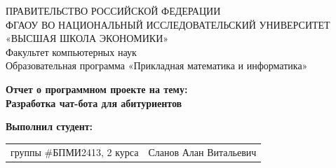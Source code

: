 \begin{titlepage}
\newpage

{
\begin{center}
ПРАВИТЕЛЬСТВО РОССИЙСКОЙ ФЕДЕРАЦИИ\\
ФГАОУ ВО НАЦИОНАЛЬНЫЙ ИССЛЕДОВАТЕЛЬСКИЙ УНИВЕРСИТЕТ\\
«ВЫСШАЯ ШКОЛА ЭКОНОМИКИ»
\\
\bigskip
Факультет компьютерных наук\\
Образовательная программа «Прикладная математика и информатика»
\end{center}
}

\vspace{2em}
\vspace{4em}

\begin{center}
{\bf Отчет о программном проекте на тему:}\\
{\bf Разработка чат-бота для абитуриентов}\\
\end{center}

\vspace{2em}

{\bf Выполнил студент: \vspace{2mm}}

{
\begin{tabular}{l@{\hskip 1.5cm}l}
группы \#БПМИ2413, 2 курса & Сланов Алан Витальевич \\
\end{tabular}}



\end{titlepage}
